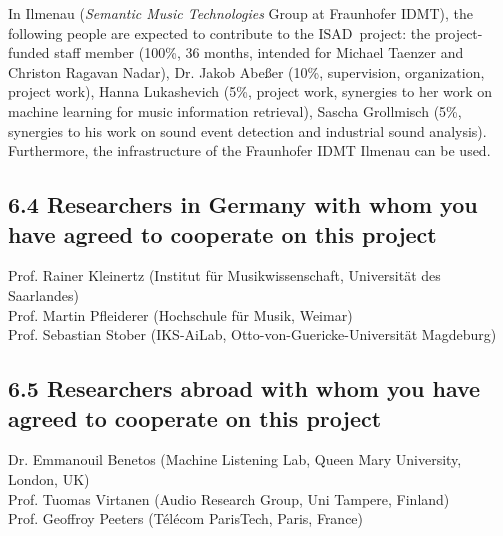 \documentclass[11pt,a4paper]{article}
\def\PN{\mathrm{ISAD}}
\theoremstyle{plain} \newtheorem{define}{Definition}[section]
\begin{document}
{In Ilmenau (\emph{Semantic Music Technologies} Group at Fraunhofer IDMT), 
the following people are expected to contribute to the $\PN$~project:
the project-funded staff member (100\%, 36 months, intended for Michael Taenzer and Christon Ragavan Nadar),
Dr. Jakob Abe{\ss}er (10\%, supervision, organization, project work),
Hanna Lukashevich (5\%, project work, synergies to her work on machine learning for music information retrieval),
Sascha Grollmisch (5\%, synergies to his work on sound event detection and industrial sound analysis).
%
Furthermore, the infrastructure of the Fraunhofer IDMT Ilmenau can be used.

\subsection*{6.4 Researchers in Germany with whom you have agreed to cooperate on this project}


Prof. Rainer Kleinertz (Institut f\"ur Musikwissenschaft, Universit\"at des Saarlandes)\\
Prof. Martin Pfleiderer (Hochschule f\"ur Musik, Weimar)\\
Prof. Sebastian Stober (IKS-AiLab, Otto-von-Guericke-Universit{\"a}t Magdeburg)

\subsection*{6.5 Researchers abroad with whom you have agreed to cooperate on this project}

Dr. Emmanouil Benetos (Machine Listening Lab, Queen Mary University, London, UK)\\
Prof. Tuomas Virtanen (Audio Research Group, Uni Tampere, Finland)\\
Prof. Geoffroy Peeters (T{\'e}l{\'e}com ParisTech, Paris, France)

}
\end{document}
